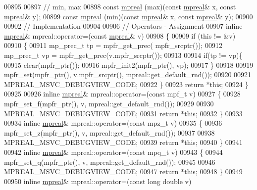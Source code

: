 \begin{DoxyCode}
00895 
00897 \textcolor{comment}{// min, max}
00898 \textcolor{keyword}{const} \hyperlink{classmpfr_1_1mpreal}{mpreal} (max)(\textcolor{keyword}{const} \hyperlink{classmpfr_1_1mpreal}{mpreal}& x, \textcolor{keyword}{const} \hyperlink{classmpfr_1_1mpreal}{mpreal}& y);
00899 \textcolor{keyword}{const} \hyperlink{classmpfr_1_1mpreal}{mpreal} (min)(\textcolor{keyword}{const} \hyperlink{classmpfr_1_1mpreal}{mpreal}& x, \textcolor{keyword}{const} \hyperlink{classmpfr_1_1mpreal}{mpreal}& y);
00900 
00902 \textcolor{comment}{// Implementation}
00904 \textcolor{comment}{}
00906 \textcolor{comment}{// Operators - Assignment}
00907 \textcolor{keyword}{inline} \hyperlink{classmpfr_1_1mpreal}{mpreal}& mpreal::operator=(\textcolor{keyword}{const} \hyperlink{classmpfr_1_1mpreal}{mpreal}& v)
00908 \{
00909     \textcolor{keywordflow}{if} (\textcolor{keyword}{this} != &v)
00910     \{
00911     mp\_prec\_t tp = mpfr\_get\_prec(  mpfr\_srcptr());
00912     mp\_prec\_t vp = mpfr\_get\_prec(v.mpfr\_srcptr());
00913 
00914     \textcolor{keywordflow}{if}(tp != vp)\{
00915       clear(mpfr\_ptr());
00916       mpfr\_init2(mpfr\_ptr(), vp);
00917     \}
00918 
00919         mpfr\_set(mpfr\_ptr(), v.mpfr\_srcptr(), mpreal::get\_default\_rnd());
00920 
00921         MPREAL\_MSVC\_DEBUGVIEW\_CODE;
00922     \}
00923     \textcolor{keywordflow}{return} *\textcolor{keyword}{this};
00924 \}
00925 
00926 \textcolor{keyword}{inline} \hyperlink{classmpfr_1_1mpreal}{mpreal}& mpreal::operator=(\textcolor{keyword}{const} mpf\_t v)
00927 \{
00928     mpfr\_set\_f(mpfr\_ptr(), v, mpreal::get\_default\_rnd());
00929 
00930     MPREAL\_MSVC\_DEBUGVIEW\_CODE;
00931     \textcolor{keywordflow}{return} *\textcolor{keyword}{this};
00932 \}
00933 
00934 \textcolor{keyword}{inline} \hyperlink{classmpfr_1_1mpreal}{mpreal}& mpreal::operator=(\textcolor{keyword}{const} mpz\_t v)
00935 \{
00936     mpfr\_set\_z(mpfr\_ptr(), v, mpreal::get\_default\_rnd());
00937 
00938     MPREAL\_MSVC\_DEBUGVIEW\_CODE;
00939     \textcolor{keywordflow}{return} *\textcolor{keyword}{this};
00940 \}
00941 
00942 \textcolor{keyword}{inline} \hyperlink{classmpfr_1_1mpreal}{mpreal}& mpreal::operator=(\textcolor{keyword}{const} mpq\_t v)
00943 \{
00944     mpfr\_set\_q(mpfr\_ptr(), v, mpreal::get\_default\_rnd());
00945 
00946     MPREAL\_MSVC\_DEBUGVIEW\_CODE;
00947     \textcolor{keywordflow}{return} *\textcolor{keyword}{this};
00948 \}
00949 
00950 \textcolor{keyword}{inline} \hyperlink{classmpfr_1_1mpreal}{mpreal}& mpreal::operator=(\textcolor{keyword}{const} \textcolor{keywordtype}{long} \textcolor{keywordtype}{double} v)

\end{DoxyCode}
